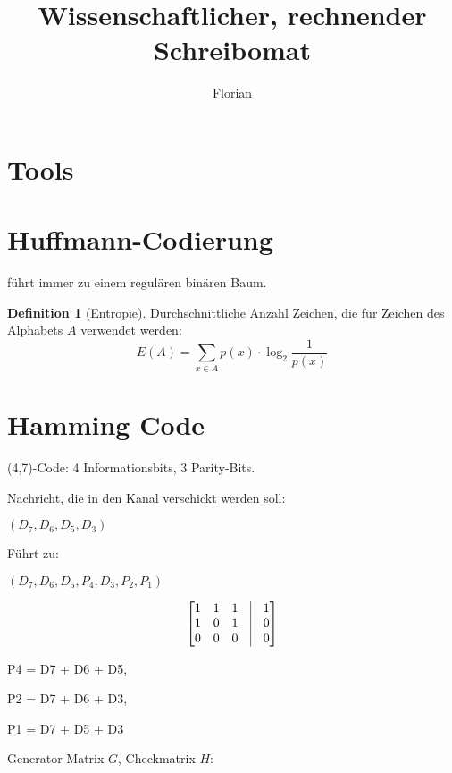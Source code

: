 \documentclass[11pt]{article} %
\title{Wissenschaftlicher, rechnender Schreibomat}
\author{Florian}
\theoremstyle{definition}
\newtheorem{definition}{Definition}
\begin{document}
\maketitle

\section*{Tools}

\section{Huffmann-Codierung}

führt immer zu einem regulären binären Baum.

\begin{definition}[Entropie]
Durchschnittliche Anzahl Zeichen, die für Zeichen des Alphabets $A$ verwendet werden:
\[
E(A) = \sum\limits_{x \in A} p(x) \cdot \log_2 \frac{1}{p(x)}
\]
\end{definition}

\section{Hamming Code}

(4,7)-Code: 4 Informationsbits, 3 Parity-Bits.

Nachricht, die in den Kanal verschickt werden soll:

$(D_7, D_6, D_5, D_3)$

Führt zu:

$(D_7, D_6, D_5, P_4, D_3, P_2, P_1)$

\[
\begin{bmatrix}
1 & 1 & 1 & \vline & 1 \\
1 & 0 & 1 & \vline & 0 \\
0 & 0 & 0 & \vline & 0
\end{bmatrix}
\]

P4 = D7 + D6 + D5,

P2 = D7 + D6 + D3,

P1 = D7 + D5 + D3

Generator-Matrix $G$, Checkmatrix $H$:
\end{document}
